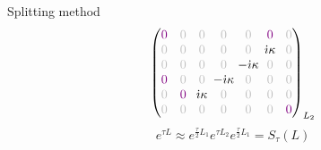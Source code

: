 \documentclass{beamer}
\newcommand{\I}{\dot{\imath}}
\begin{document}
\begin{frame}{Splitting method}
$${\begin{pmatrix}
      \textcolor{violet}{0} &  \gz & \gz                      &  \gz                      &  \gz                      & \textcolor{violet}{0}            & \gz \\
      \gz &  \gz & \gz                      &  \gz                      &  \gz                      & \hspace{-0.125cm}{\I\kappa}\hspace{-0.125cm} & \gz \\ 
      \gz &  \gz & \gz                      &  \gz                      & \hspace{-0.125cm}{-\I\kappa}\hspace{-0.125cm} & \gz                      & \gz \\ 
      \textcolor{violet}{0}  &  \gz & \gz                      & \hspace{-0.125cm}{-\I\kappa}\hspace{-0.125cm} &  \gz                      & \gz                      & \gz \\ 
      \gz & \textcolor{violet}{0}   & \hspace{-0.125cm}{\I\kappa}\hspace{-0.125cm} &  \gz                      &  \gz                      & \gz                      & \gz \\ 
      \gz &  \gz & \gz                      &  \gz                      &  \gz                      & \gz                      & \textcolor{violet}{0} \\ 
    \end{pmatrix}}_{L_2}
  $$
  $$
    e^{\tau L} \approx e^{\frac{\tau}{2}L_1}e^{\tau L_2}e^{\frac{\tau}{2}L_1} = S_{\tau}(L)
  $$
\end{frame}
\end{document}
